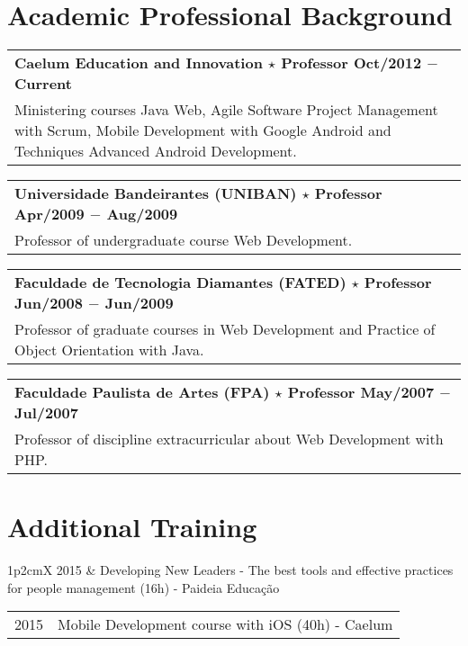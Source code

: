 \documentclass[a4paper, oneside, final]{scrartcl}
\newcommand{\vspc}{\vspace{0.15cm}} %
\newcommand{\vspcitem}{\vspace{0.1cm}} %
\begin{document}
\begin{center}
\section{Academic Professional Background}
\begin{tabularx}{1\linewidth}{X}
{\bf Caelum Education and Innovation $\star$ Professor \hfill Oct/2012 $-$ Current} \\
Ministering courses Java Web, Agile Software Project Management with Scrum, Mobile Development with Google Android and Techniques Advanced Android Development. \vspc\\
\end{tabularx}

\begin{tabularx}{1\linewidth}{X}
{\bf Universidade Bandeirantes (UNIBAN) $\star$ Professor \hfill Apr/2009 $-$ Aug/2009} \\
Professor of undergraduate course Web Development. \vspc\\

\end{tabularx}

\begin{tabularx}{1\linewidth}{X}
{\bf Faculdade de Tecnologia Diamantes (FATED) $\star$ Professor \hfill Jun/2008 $-$ Jun/2009} \\
Professor of graduate courses in Web Development and Practice of Object Orientation with Java. \vspc\\
\end{tabularx}

\begin{tabularx}{1\linewidth}{X}
{\bf Faculdade Paulista de Artes (FPA) $\star$ Professor  \hfill May/2007 $-$ Jul/2007} \\
Professor of discipline extracurricular about Web Development with PHP. \vspc\\
\end{tabularx}

\section{Additional Training}
\begin{tabularx}{1\linewidth}{p{2cm}X}
2015       &  Developing New Leaders - The best tools and effective practices for people management (16h) - Paideia Educação \vspcitem\\
\end{tabularx}

\begin{tabularx}{1\linewidth}{p{2cm}X}
2015       & Mobile Development course with iOS (40h) - Caelum \vspcitem\\
\end{tabularx}


\end{center}
\end{document}
